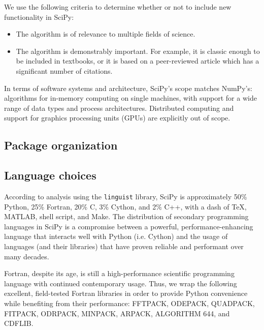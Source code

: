 \documentclass[fleqn,10pt]{wlscirep}
\begin{document}
We use the following criteria to determine whether or not to include new
functionality in SciPy:
\begin{itemize}
    \item The algorithm is of relevance to multiple fields of science.
    \item The algorithm is demonstrably important.  For example, it is classic
    enough to be included in textbooks, or it is based on a peer-reviewed article
    which has a significant number of citations.
\end{itemize}

In terms of software systems and architecture, SciPy's scope matches NumPy's:
algorithms for in-memory computing on single machines, with support for a wide
range of data types and process architectures. Distributed computing and support
for graphics processing units (GPUs) are explicitly out of scope.

\subsection*{Package organization}


\subsection*{Language choices}

According to analysis using the \texttt{linguist} library\cite{linguistref}, SciPy is approximately 50\% Python, 25\% Fortran, 20\% C, 3\% Cython, and 2\% C++, with a dash of \TeX, MATLAB, shell script, and Make. The distribution of secondary programming languages in SciPy is a compromise between a powerful, performance-enhancing language that interacts well with Python (i.e. Cython) and the usage of languages (and their libraries) that have proven reliable and performant over many decades.

Fortran, despite its age, is still a high-performance scientific programming language with 
continued contemporary usage\cite{Koelbel:1993:HPF:562354}. Thus, we wrap the following excellent, field-tested Fortran
libraries in order to provide Python convenience while benefiting from their performance: 
FFTPACK\cite{SWARZTRAUBER198445, SWARZTRAUBER198251}, %
ODEPACK\cite{citeulike:2644528}, %
QUADPACK\cite{1983qspa.book.....P}, %
FITPACK\cite{Dierckx:1993:CSF:151103}, %
ODRPACK\cite{ODRPACK_Boggs}, %
MINPACK\cite{osti_6997568}, %
ARPACK\cite{leh:sor:yan96}, %
ALGORITHM 644\cite{Amos:1986:APP:7921.214331}, and %
CDFLIB\cite{CDFLIB_site}. %
\end{document}
